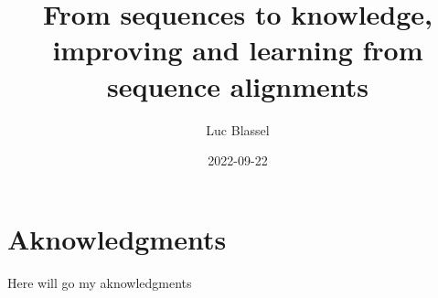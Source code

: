 \documentclass[
  11pt,
  twoside,
  BCOR=10mm,
  listof=totoc]{scrbook}
\title{From sequences to knowledge, improving and learning from sequence alignments}
\author{Luc Blassel}
\date{2022-09-22}
\begin{document}
\maketitle




\pagestyle{empty}

\cleardoubleevenpage

\frontmatter

\chapter{Aknowledgments}
Here will go my aknowledgments
\lipsum[7-9]

{
\setcounter{tocdepth}{2}
\tableofcontents
}
\listoffigures
\listoftables
\pagestyle{empty}
\end{document}
